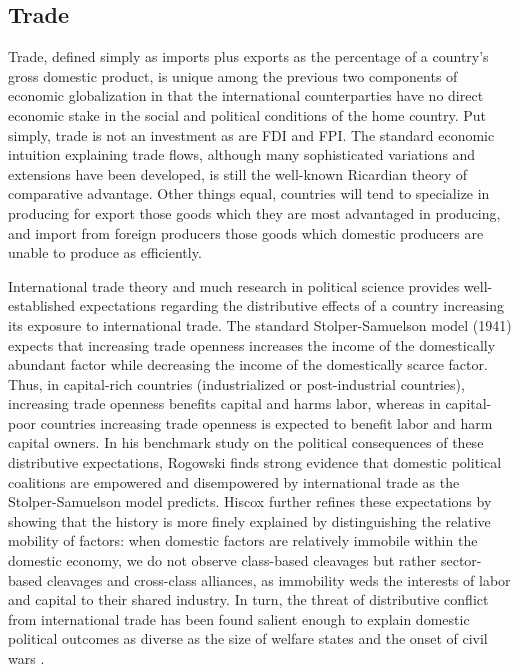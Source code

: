 \documentclass[12pt,a4paper]{article}\usepackage[]{graphicx}\usepackage[]{color}
\begin{document}
\subsection{Trade}

Trade, defined simply as imports plus exports as the percentage of a country's gross domestic product, is unique among the previous two components of economic globalization in that the international counterparties have no direct economic stake in the social and political conditions of the home country. Put simply, trade is not an investment as are FDI and FPI. The standard economic intuition explaining trade flows, although many sophisticated variations and extensions have been developed, is still the well-known Ricardian theory of comparative advantage. Other things equal, countries will tend to specialize in producing for export those goods which they are most advantaged in producing, and import from foreign producers those goods which domestic producers are unable to produce as efficiently.

International trade theory and much research in political science provides well-established expectations regarding the distributive effects of a country increasing its exposure to international trade. The standard Stolper-Samuelson model (1941) expects that increasing trade openness increases the income of the domestically abundant factor while decreasing the income of the domestically scarce factor. Thus, in capital-rich countries (industrialized or post-industrial countries), increasing trade openness benefits capital and harms labor, whereas in capital-poor countries increasing trade openness is expected to benefit labor and harm capital owners. In his benchmark study on the political consequences of these distributive expectations, Rogowski \parencite*{Rogowski:1989wm} finds strong evidence that domestic political coalitions are empowered and disempowered by international trade as the Stolper-Samuelson model predicts. Hiscox \parencite*{Hiscox:2002us} further refines these expectations by showing that the history is more finely explained by distinguishing the relative mobility of factors: when domestic factors are relatively immobile within the domestic economy, we do not observe class-based cleavages but rather sector-based cleavages and cross-class alliances, as immobility weds the interests of labor and capital to their shared industry. In turn, the threat of distributive conflict from international trade has been found salient enough to explain domestic political outcomes as diverse as the size of welfare states \parencites{Cameron:1978vb}{Burgoon:2001dp} and the onset of civil wars \parencite{Bussmann:2007vx}.
\end{document}
